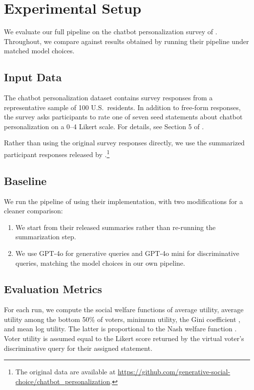 \documentclass[11pt]{article}
\begin{document}
\section{Experimental Setup}

We evaluate our full pipeline on the chatbot personalization survey of \citet{fish-v2}. Throughout, we compare against results obtained by running their pipeline under matched model choices.

\subsection{Input Data}

The chatbot personalization dataset contains survey responses from a representative sample of 100 U.S.\ residents. In addition to free-form responses, the survey asks participants to rate one of seven seed statements about chatbot personalization on a 0--4 Likert scale. For details, see Section 5 of \citet{fish-v2}.

Rather than using the original survey responses directly, we use the summarized participant responses released by \citet{fish-v2}.\footnote{The original data are available at \url{https://github.com/generative-social-choice/chatbot_personalization}.}

\subsection{Baseline}

We run the pipeline of \citet{fish-v2} using their implementation, with two modifications for a cleaner comparison:
\begin{enumerate}
    \item We start from their released summaries rather than re-running the summarization step.
    \item We use GPT-4o for generative queries and GPT-4o mini for discriminative queries, matching the model choices in our own pipeline.
\end{enumerate}

\subsection{Evaluation Metrics}
\label{sec:metrics}

For each run, we compute the social welfare functions of average utility, average utility among the bottom 50\% of voters, minimum utility, the Gini coefficient \citep{gini}, and mean log utility. The latter is proportional to the Nash welfare function \citep{nash-welfare}. Voter utility is assumed equal to the Likert score returned by the virtual voter's discriminative query for their assigned statement.
\end{document}
